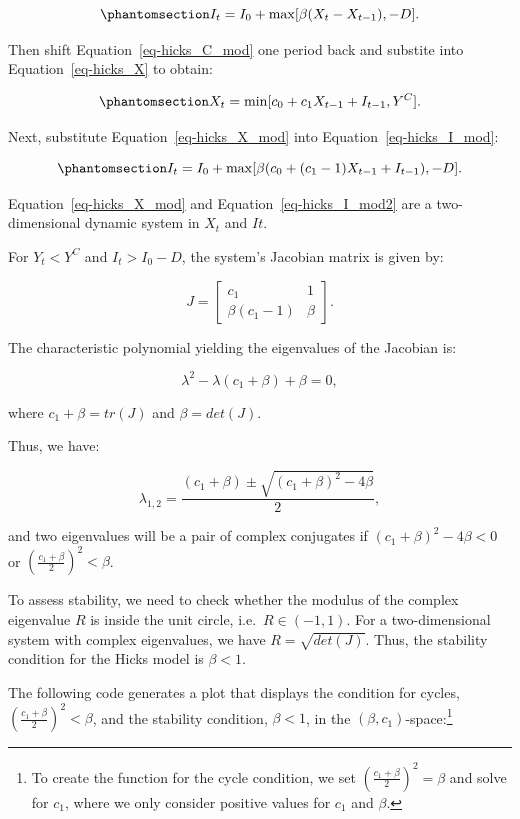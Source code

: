\documentclass[
  letterpaper,
  DIV=11,
  numbers=noendperiod]{scrreprt}
\begin{document}
\begin{equation}\phantomsection\label{eq-hicks_I_mod}{
I_{t} = I_0 + \max[\beta(X_{t} - X_{t-1}), -D].
}\end{equation}

Then shift Equation~\ref{eq-hicks_C_mod} one period back and substite
into Equation~\ref{eq-hicks_X} to obtain:

\begin{equation}\phantomsection\label{eq-hicks_X_mod}{
  X_{t}=\min [c_0 + c_1 X_{t-1} + I_{t-1}, Y^C]. 
}\end{equation}

Next, substitute Equation~\ref{eq-hicks_X_mod} into
Equation~\ref{eq-hicks_I_mod}:

\begin{equation}\phantomsection\label{eq-hicks_I_mod2}{
I_{t} = I_0 + \max[\beta( c_0 + (c_1 -1) X_{t-1} + I_{t-1}), -D].
}\end{equation}

Equation~\ref{eq-hicks_X_mod} and Equation~\ref{eq-hicks_I_mod2} are a
two-dimensional dynamic system in \(X_t\) and \(It\).

For \(Y_t < Y^C\) and \(I_t > I_0 - D\), the system's Jacobian matrix is
given by:

\[
J=\begin{bmatrix} c_1 & 1 \\ \beta(c_1-1) & \beta  \end{bmatrix}.
\]

The characteristic polynomial yielding the eigenvalues of the Jacobian
is:

\[\lambda^2-\lambda(c_1+\beta)+\beta=0,\]

where \(c_1+\beta =tr(J)\) and \(\beta = det(J)\).

Thus, we have:

\[
\lambda_{1,2} = \frac{(c_1+\beta) \pm \sqrt{(c_1+\beta)^2-4\beta}}{2},
\]

and two eigenvalues will be a pair of complex conjugates if
\((c_1+\beta)^2-4\beta <0\) or
\(\left( \frac{c_1+\beta}{2} \right)^2 < \beta\).

To assess stability, we need to check whether the modulus of the complex
eigenvalue \(R\) is inside the unit circle, i.e.~\(R \in (-1,1)\). For a
two-dimensional system with complex eigenvalues, we have
\(R=\sqrt{det(J)}\). Thus, the stability condition for the Hicks model
is \(\beta <1\).

The following code generates a plot that displays the condition for
cycles, \(\left( \frac{c_1+\beta}{2} \right)^2 < \beta\), and the
stability condition, \(\beta <1\), in the
\((\beta, c_1)\)-space:\footnote{To create the function for the cycle
  condition, we set \(\left( \frac{c_1+\beta}{2} \right)^2 = \beta\) and
  solve for \(c_1\), where we only consider positive values for \(c_1\)
  and \(\beta\).}
\end{document}
